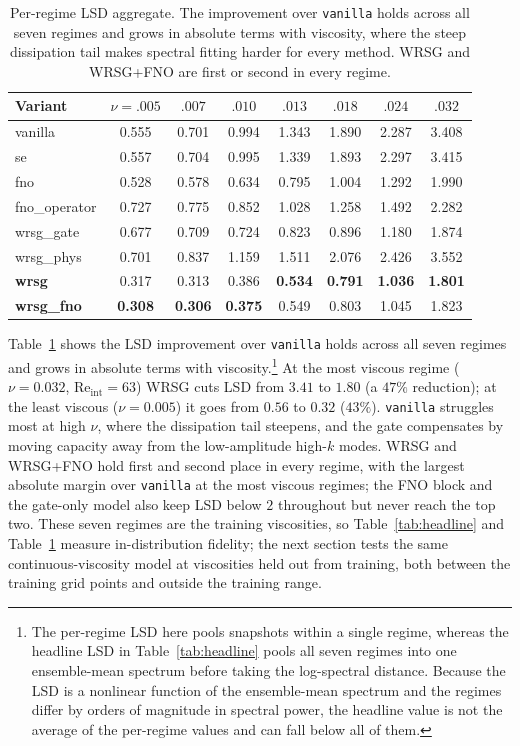\documentclass[10pt]{article} %
\begin{document}
\begin{table}[t]
\centering
\caption{Per-regime LSD aggregate. The improvement over \texttt{vanilla} holds across all seven regimes and grows in absolute terms with viscosity, where the steep dissipation tail makes spectral fitting harder for every method. WRSG and WRSG+FNO are first or second in every regime.}
\label{tab:regime}
\small
\setlength{\tabcolsep}{4pt}
\begin{tabular}{lccccccc}
\toprule
Variant & $\nu{=}.005$ & $.007$ & $.010$ & $.013$ & $.018$ & $.024$ & $.032$ \\
\midrule
vanilla         & 0.555 & 0.701 & 0.994 & 1.343 & 1.890 & 2.287 & 3.408 \\
se              & 0.557 & 0.704 & 0.995 & 1.339 & 1.893 & 2.297 & 3.415 \\
fno             & 0.528 & 0.578 & 0.634 & 0.795 & 1.004 & 1.292 & 1.990 \\
fno\_operator   & 0.727 & 0.775 & 0.852 & 1.028 & 1.258 & 1.492 & 2.282 \\
wrsg\_gate      & 0.677 & 0.709 & 0.724 & 0.823 & 0.896 & 1.180 & 1.874 \\
wrsg\_phys      & 0.701 & 0.837 & 1.159 & 1.511 & 2.076 & 2.426 & 3.552 \\
\textbf{wrsg}   & 0.317 & 0.313 & 0.386 & \textbf{0.534} & \textbf{0.791} & \textbf{1.036} & \textbf{1.801} \\
\textbf{wrsg\_fno} & \textbf{0.308} & \textbf{0.306} & \textbf{0.375} & 0.549 & 0.803 & 1.045 & 1.823 \\
\bottomrule
\end{tabular}
\end{table}

Table~\ref{tab:regime} shows the LSD improvement over \texttt{vanilla} holds across all seven regimes and grows in absolute terms with viscosity.\footnote{The per-regime LSD here pools snapshots within a single regime, whereas the headline LSD in Table~\ref{tab:headline} pools all seven regimes into one ensemble-mean spectrum before taking the log-spectral distance. Because the LSD is a nonlinear function of the ensemble-mean spectrum and the regimes differ by orders of magnitude in spectral power, the headline value is not the average of the per-regime values and can fall below all of them.} At the most viscous regime ($\nu = 0.032$, $\text{Re}_{\text{int}} = 63$) WRSG cuts LSD from $3.41$ to $1.80$ (a $47\%$ reduction); at the least viscous ($\nu = 0.005$) it goes from $0.56$ to $0.32$ ($43\%$). \texttt{vanilla} struggles most at high $\nu$, where the dissipation tail steepens, and the gate compensates by moving capacity away from the low-amplitude high-$k$ modes. WRSG and WRSG+FNO hold first and second place in every regime, with the largest absolute margin over \texttt{vanilla} at the most viscous regimes; the FNO block and the gate-only model also keep LSD below $2$ throughout but never reach the top two. These seven regimes are the training viscosities, so Table~\ref{tab:headline} and Table~\ref{tab:regime} measure in-distribution fidelity; the next section tests the same continuous-viscosity model at viscosities held out from training, both between the training grid points and outside the training range.
\end{document}
